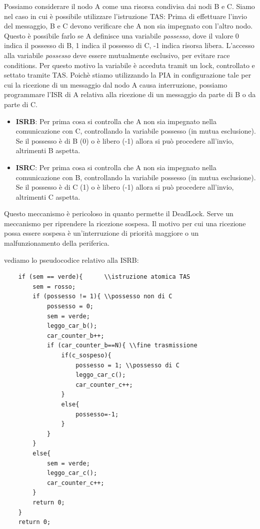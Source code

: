 Possiamo considerare il nodo A come una risorsa condivisa dai nodi B e C. Siamo nel caso in cui è possibile utilizzare l'istruzione TAS: Prima di effettuare l'invio del messaggio, B e C devono verificare che A non sia impegnato con l'altro nodo. Questo è possibile farlo se A definisce una variabile \textit{possesso}, dove il valore 0 indica il possesso di B, 1 indica il possesso di C, -1 indica risorsa libera. L'accesso alla variabile \textit{possesso} deve essere mutualmente esclusivo, per evitare race conditions. Per questo motivo la variabile è acceduta tramit un lock, controllato e settato tramite TAS. 
Poichè stiamo utilizzando la PIA in configurazione tale per cui la ricezione di un messaggio dal nodo A causa interruzione, possiamo programmare l'ISR di A relativa alla ricezione di un messaggio da parte di B o da parte di C. 

\begin{itemize}
    \item \textbf{ISRB}: Per prima cosa si controlla che A non sia impegnato nella comunicazione con C, controllando la variabile possesso (in mutua esclusione). Se il possesso è di B (0) o è libero (-1) allora si può procedere all'invio, altrimenti B aspetta. 
    \item \textbf{ISRC}: Per prima cosa si controlla che A non sia impegnato nella comunicazione con B, controllando la variabile possesso (in mutua esclusione). Se il possesso è di C (1) o è libero (-1) allora si può procedere all'invio, altrimenti C aspetta.
\end{itemize}

Questo meccanismo è pericoloso in quanto permette il DeadLock. Serve un meccanismo per riprendere la ricezione sospesa. Il motivo per cui una ricezione possa essere sospesa è un'interruzione di priorità maggiore o un malfunzionamento della periferica. 

vediamo lo pseudocodice relativo alla ISRB:

\begin{lstlisting}
    if (sem == verde){      \\istruzione atomica TAS
        sem = rosso;
        if (possesso != 1){ \\possesso non di C
            possesso = 0;
            sem = verde;
            leggo_car_b();
            car_counter_b++;
            if (car_counter_b==N){ \\fine trasmissione
                if(c_sospeso){
                    possesso = 1; \\possesso di C
                    leggo_car_c();
                    car_counter_c++;
                }
                else{
                    possesso=-1;
                }
            }
        }
        else{
            sem = verde;
            leggo_car_c();
            car_counter_c++;
        }
        return 0;
    }
    return 0;
\end{lstlisting}

